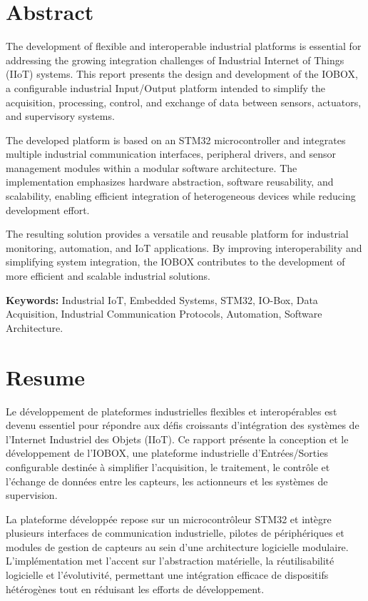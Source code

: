 \clearpage
\thispagestyle{empty}

\chapter*{{\emph\LARGE{Abstract}}}

The development of flexible and interoperable industrial platforms is essential for addressing the growing integration challenges of Industrial Internet of Things (IIoT) systems. This report presents the design and development of the IOBOX, a configurable industrial Input/Output platform intended to simplify the acquisition, processing, control, and exchange of data between sensors, actuators, and supervisory systems.

The developed platform is based on an STM32 microcontroller and integrates multiple industrial communication interfaces, peripheral drivers, and sensor management modules within a modular software architecture. The implementation emphasizes hardware abstraction, software reusability, and scalability, enabling efficient integration of heterogeneous devices while reducing development effort.

The resulting solution provides a versatile and reusable platform for industrial monitoring, automation, and IoT applications. By improving interoperability and simplifying system integration, the IOBOX contributes to the development of more efficient and scalable industrial solutions.

\textbf{Keywords:} Industrial IoT, Embedded Systems, STM32, IO-Box, Data Acquisition, Industrial Communication Protocols, Automation, Software Architecture.

\clearpage
\chapter*{{\emph\Large{Resume}}}

\sloppy
Le développement de plateformes industrielles flexibles et interopérables est devenu essentiel pour répondre aux défis croissants d’intégration des systèmes de l’Internet Industriel des Objets (IIoT). Ce rapport présente la conception et le développement de l’IOBOX, une plateforme industrielle d’Entrées/Sorties configurable destinée à simplifier l’acquisition, le traitement, le contrôle et l’échange de données entre les capteurs, les actionneurs et les systèmes de supervision.

La plateforme développée repose sur un microcontrôleur STM32 et intègre plusieurs interfaces de communication industrielle, pilotes de périphériques et modules de gestion de capteurs au sein d’une architecture logicielle modulaire. L’implémentation met l’accent sur l’abstraction matérielle, la réutilisabilité logicielle et l’évolutivité, permettant une intégration efficace de dispositifs hétérogènes tout en réduisant les efforts de développement.

